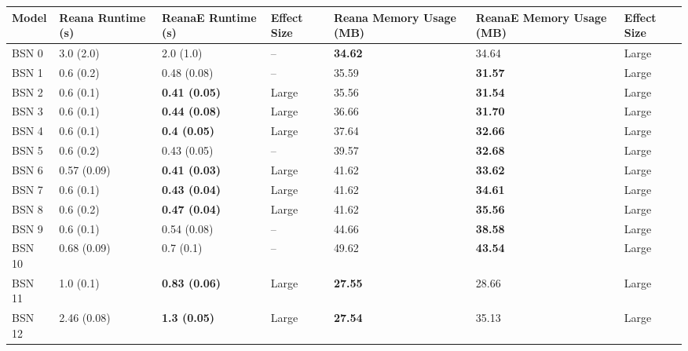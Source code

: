 \begin{tabular}{lllllll}
\toprule
  Model &      Reana Runtime (s) &     ReanaE Runtime (s) & Effect Size & Reana Memory Usage (MB) & ReanaE Memory Usage (MB) & Effect Size \\
\midrule
  BSN 0 &              3.0 (2.0) &              2.0 (1.0) &          -- &          \textbf{34.62} &                    34.64 &       Large \\
  BSN 1 &              0.6 (0.2) &            0.48 (0.08) &          -- &                   35.59 &           \textbf{31.57} &       Large \\
  BSN 2 &              0.6 (0.1) &   \textbf{0.41 (0.05)} &       Large &                   35.56 &           \textbf{31.54} &       Large \\
  BSN 3 &              0.6 (0.1) &   \textbf{0.44 (0.08)} &       Large &                   36.66 &           \textbf{31.70} &       Large \\
  BSN 4 &              0.6 (0.1) &    \textbf{0.4 (0.05)} &       Large &                   37.64 &           \textbf{32.66} &       Large \\
  BSN 5 &              0.6 (0.2) &            0.43 (0.05) &          -- &                   39.57 &           \textbf{32.68} &       Large \\
  BSN 6 &            0.57 (0.09) &   \textbf{0.41 (0.03)} &       Large &                   41.62 &           \textbf{33.62} &       Large \\
  BSN 7 &              0.6 (0.1) &   \textbf{0.43 (0.04)} &       Large &                   41.62 &           \textbf{34.61} &       Large \\
  BSN 8 &              0.6 (0.2) &   \textbf{0.47 (0.04)} &       Large &                   41.62 &           \textbf{35.56} &       Large \\
  BSN 9 &              0.6 (0.1) &            0.54 (0.08) &          -- &                   44.66 &           \textbf{38.58} &       Large \\
 BSN 10 &            0.68 (0.09) &              0.7 (0.1) &          -- &                   49.62 &           \textbf{43.54} &       Large \\
 BSN 11 &              1.0 (0.1) &   \textbf{0.83 (0.06)} &       Large &          \textbf{27.55} &                    28.66 &       Large \\
 BSN 12 &            2.46 (0.08) &    \textbf{1.3 (0.05)} &       Large &          \textbf{27.54} &                    35.13 &       Large \\

\end{tabular}
